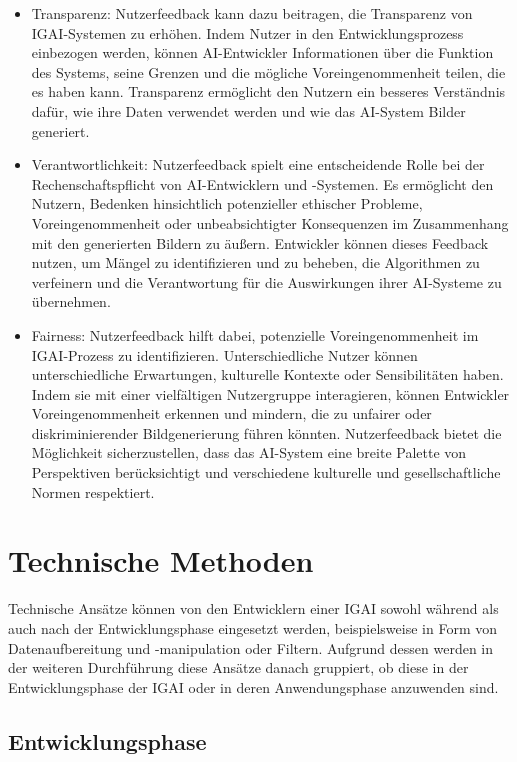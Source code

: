 \documentclass[12pt]{report}
\begin{document}
\begin{itemize}
	\item Transparenz: Nutzerfeedback kann dazu beitragen, die Transparenz von IGAI-Systemen zu erhöhen. Indem Nutzer in den Entwicklungsprozess einbezogen werden, können AI-Entwickler Informationen über die Funktion des Systems, seine Grenzen und die mögliche Voreingenommenheit teilen, die es haben kann. Transparenz ermöglicht den Nutzern ein besseres Verständnis dafür, wie ihre Daten verwendet werden und wie das AI-System Bilder generiert.
	\item Verantwortlichkeit: Nutzerfeedback spielt eine entscheidende Rolle bei der Rechenschaftspflicht von AI-Entwicklern und -Systemen. Es ermöglicht den Nutzern, Bedenken hinsichtlich potenzieller ethischer Probleme, Voreingenommenheit oder unbeabsichtigter Konsequenzen im Zusammenhang mit den generierten Bildern zu äußern. Entwickler können dieses Feedback nutzen, um Mängel zu identifizieren und zu beheben, die Algorithmen zu verfeinern und die Verantwortung für die Auswirkungen ihrer AI-Systeme zu übernehmen.
	\item Fairness: Nutzerfeedback hilft dabei, potenzielle Voreingenommenheit im IGAI-Prozess zu identifizieren. Unterschiedliche Nutzer können unterschiedliche Erwartungen, kulturelle Kontexte oder Sensibilitäten haben. Indem sie mit einer vielfältigen Nutzergruppe interagieren, können Entwickler Voreingenommenheit erkennen und mindern, die zu unfairer oder diskriminierender Bildgenerierung führen könnten. Nutzerfeedback bietet die Möglichkeit sicherzustellen, dass das AI-System eine breite Palette von Perspektiven berücksichtigt und verschiedene kulturelle und gesellschaftliche Normen respektiert.
\end{itemize}


\section{Technische Methoden}

Technische Ansätze können von den Entwicklern einer IGAI sowohl während als auch nach der Entwicklungsphase eingesetzt werden, beispielsweise in Form von Datenaufbereitung und -manipulation oder Filtern. Aufgrund dessen werden in der weiteren Durchführung diese Ansätze danach gruppiert, ob diese in der Entwicklungsphase der IGAI oder in deren Anwendungsphase anzuwenden sind.

\subsection{Entwicklungsphase}
\end{document}
